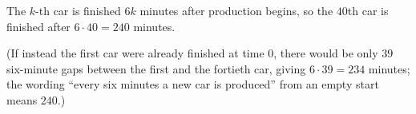 The $k$-th car is finished $6k$ minutes after production begins, so the $40$th car is finished after $6\cdot40=\boxed{240}$ minutes.

(If instead the first car were already finished at time $0$, there would be only $39$ six-minute gaps between the first and the fortieth car, giving $6\cdot39=234$ minutes; the wording ``every six minutes a new car is produced'' from an empty start means $240$.)

